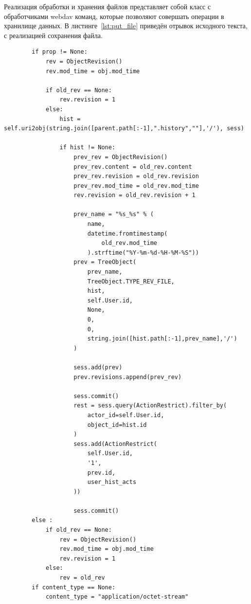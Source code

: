 \documentclass[utf8,usehyperref,12pt]{G7-32}
\begin{document}
Реализация обработки и хранения файлов представляет собой класс с обработчиками webdav команд, которые позволяют совершать операции в хранилище данных. В листинге~\ref{lst:put_file} приведён отрывок исходного текста, с реализацией сохранения файла.

\lstset{language=Python,caption=Сохранение файла,label=lst:put_file}
\begin{lstlisting}
		if prop != None:
            rev = ObjectRevision()
            rev.mod_time = obj.mod_time
        
            if old_rev == None:
                rev.revision = 1            
            else:
                hist = self.uri2obj(string.join([parent.path[:-1],".history",""],'/'), sess)                           
                
                if hist != None:                    
                    prev_rev = ObjectRevision()
                    prev_rev.content = old_rev.content
                    prev_rev.revision = old_rev.revision
                    prev_rev.mod_time = old_rev.mod_time
                    rev.revision = old_rev.revision + 1
                    
                    prev_name = "%s_%s" % (
                    	name, 
                    	datetime.fromtimestamp(
                    		old_rev.mod_time
                    	).strftime("%Y-%m-%d-%H-%M-%S"))    
                    prev = TreeObject(
                    	prev_name,
                    	TreeObject.TYPE_REV_FILE,
                    	hist,
                    	self.User.id,
                    	None,
                    	0,
                    	0,
                    	string.join([hist.path[:-1],prev_name],'/')
                    )
                   
                    sess.add(prev)
                    prev.revisions.append(prev_rev)                
                    
                    sess.commit() 
                    rest = sess.query(ActionRestrict).filter_by(
	                    actor_id=self.User.id, 
    	                object_id=hist.id 
    	            )       
                    sess.add(ActionRestrict(
                    	self.User.id, 
                    	'1', 
                    	prev.id, 
                    	user_hist_acts 
                    ))
                    
                    sess.commit()
        else :
            if old_rev == None:
                rev = ObjectRevision()
                rev.mod_time = obj.mod_time
                rev.revision = 1
            else:
                rev = old_rev           
        if content_type == None:
            content_type = "application/octet-stream"
        

\end{lstlisting}
\end{document}
